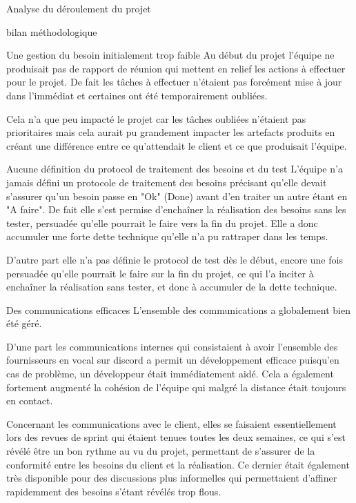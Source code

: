 \documentclass[]{article}
\begin{document}
{\begin{section}{Analyse du déroulement du projet}
\begin{subsection}{bilan méthodologique}
     \begin{subsubsection}{Une gestion du besoin initialement trop faible}
         Au début du projet l'équipe ne produisait pas de rapport de réunion qui mettent en relief les actions à effectuer pour le projet. De fait les tâches à effectuer n'étaient pas forcément mise à jour dans l'immédiat et certaines ont été temporairement oubliées.

         Cela n'a que peu impacté le projet car les tâches oubliées n'étaient pas prioritaires mais cela aurait pu grandement impacter les artefacts produits en créant une différence entre ce qu'attendait le client et ce que produisait l'équipe.
     \end{subsubsection}

     \begin{subsubsection}{Aucune définition du protocol de traitement des besoins et du test}
         L'équipe n'a jamais défini un protocole de traitement des besoins précisant qu'elle devait s'assurer qu'un besoin passe en "Ok" (Done) avant d'en traiter un autre étant en "A faire". De fait elle s'est permise d'enchaîner la réalisation des besoins sans les tester, persuadée qu'elle pourrait le faire vers la fin du projet. Elle a donc accumuler une forte dette technique qu'elle n'a pu rattraper dans les temps.

         D'autre part elle n'a pas définie le protocol de test dès le début, encore une fois persuadée qu'elle pourrait le faire sur la fin du projet, ce qui l'a inciter à enchaîner la réalisation sans tester, et donc à accumuler de la dette technique.
     \end{subsubsection}

     \begin{subsubsection}{Des communications efficaces}
         L'ensemble des communications a globalement bien été géré.

         D'une part les communications internes qui consistaient à avoir l'ensemble des fournisseurs en vocal sur discord a permit un développement efficace puisqu'en cas de problème, un développeur était immédiatement aidé. Cela a également fortement augmenté la cohésion de l'équipe qui malgré la distance était toujours en contact.

         Concernant les communications avec le client, elles se faisaient essentiellement lors des revues de sprint qui étaient tenues toutes les deux semaines, ce qui s'est révélé être un bon rythme au vu du projet, permettant de s'assurer de la conformité entre les besoins du client et la réalisation. Ce dernier était également très disponible pour des discussions plus informelles qui permettaient d'affiner rapidemment des besoins s'étant révélés trop flous.
     \end{subsubsection}


\end{subsection}
\end{section}}
\end{document}
